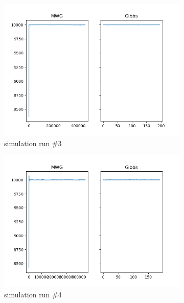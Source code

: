 \begin{figure}[H]
\begin{subfigure}{.3\textwidth}
    	\includegraphics[width=\linewidth]{../../plots/Trace_M2_N20000_NMCMC3_seed2_diffind2.png}
    	\caption{simulation run \#3}
	\end{subfigure}
	\begin{subfigure}{.3\textwidth}
	    \centering
    	\includegraphics[width=\linewidth]{../../plots/Trace_M2_N20000_NMCMC3_seed3_diffind2.png}
    	\caption{simulation run \#4}
	\end{subfigure}
	\begin{subfigure}{.3\textwidth}
	    \centering

\end{subfigure}
\end{figure}

